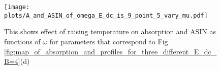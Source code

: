 \documentclass[40pt,letterpaper,physrev]{article}
\begin{document}
	\begin{figure}[H]
	  \centering
	  \normalsize %
	  \texttt{[image: plots/A\_and\_ASIN\_of\_omega\_E\_dc\_is\_9\_point\_5\_vary\_mu.pdf]}
	  \caption{This shows effect of raising temperature on absorption and ASIN as functions of $\omega$ for parameters that 
	  correspond to Fig \ref{fig:map_of_absorption_and_profiles_for_three_different_E_dc_B=4}(d)}
	  \label{fig:E_dc=9.5_B=4_different_mu}	  
	\end{figure}		
\end{document}
